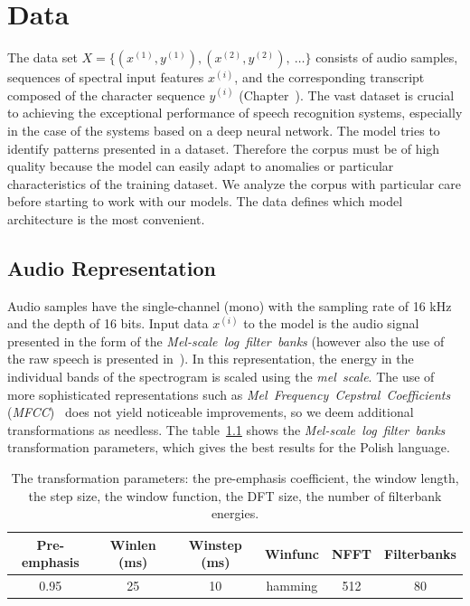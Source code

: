 
\chapter{Data}\label{ch:data}

The data set $X = \{(x^{(1)}, y^{(1)}), (x^{(2)}, y^{(2)}), \ \dots\}$ consists of audio samples,
sequences of spectral input features $x^{(i)}$, and the corresponding transcript
composed of the character sequence $y^{(i)}$ (Chapter~).
The vast dataset is crucial to achieving the exceptional performance of speech recognition systems,
especially in the case of the systems based on a deep neural network.
The model tries to identify patterns presented in a dataset.
Therefore the corpus must be of high quality because the model can easily adapt
to anomalies or particular characteristics of the training dataset.
We analyze the corpus with particular care before starting to work with our models.
The data defines which model architecture is the most convenient.


\section{Audio Representation}\label{sec:audio-representation}

Audio samples have the single-channel (mono) with the sampling rate of 16 kHz and the depth of 16 bits.
Input data $x^{(i)}$ to the model is the audio signal presented in the form
of the \textit{Mel-scale~log~filter~banks} (however also the use of the raw speech is presented in~\cite{zeghidour2019}).
In this representation, the energy in the individual bands of the spectrogram
is scaled using the \textit{mel~scale}.
The use of more sophisticated representations such as \textit{Mel~Frequency~Cepstral~Coefficients} (\textit{MFCC})~\cite{sahidullah2012}
does not yield noticeable improvements, so we deem additional transformations as needless.
The table~\ref{table:data-features} shows the \textit{Mel-scale~log~filter~banks} transformation parameters,
which gives the best results for the Polish language.

\begin{table}[h!]
\vspace*{10pt}
\centering
 \begin{tabular}{c c c c c c}
  \toprule
  Pre-emphasis & Winlen (ms) & Winstep (ms) & Winfunc & NFFT & Filterbanks \\
  \midrule
  0.95  &  25  &  10  & hamming & 512 & 80
  \bottomrule
 \end{tabular}
\caption{
The transformation parameters: the pre-emphasis coefficient, the window length, the step size,
the window function, the DFT size, the number of filterbank energies.
}
\label{table:data-features}
\end{table}

